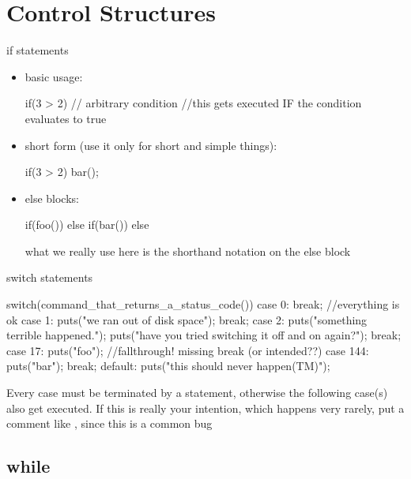 \documentclass[10pt,graphics,aspectratio=169,table]{beamer}
\begin{document}
\section{Control Structures}
\begin{frame}[fragile]{if statements}
    \begin{itemize}
    \item basic usage:
        \begin{codeblock} 
if(3 > 2){  // arbitrary condition
    //this gets executed IF the condition evaluates to true
}
        \end{codeblock}
    \item short form (use it only for short and simple things):
        \begin{codeblock} 
if(3 > 2) bar();
        \end{codeblock}

    \item else blocks:
        \begin{codeblock} 
if(foo()){ 
}
else if(bar()){ 
}
else{ 
}
        \end{codeblock}

        what we really use here is the shorthand notation on the else block

    \end{itemize}
\end{frame}

\begin{frame}[fragile]{switch statements}
    \begin{codeblock}
switch(command_that_returns_a_status_code()){
    case 0: break; //everything is ok
    case 1: puts("we ran out of disk space"); break;
    case 2: {
        puts("something terrible happened.");
        puts("have you tried switching it off and on again?");
    }break;
    case 17: puts("foo"); //fallthrough! missing break (or intended??)
    case 144: puts("bar"); break;
    default: puts("this should never happen(TM)");
}
    \end{codeblock}
    Every case must be terminated by a  statement, otherwise the 
    following case(s) also get executed. If this is really your intention,
    which happens very rarely, put a comment like , 
    since this is a common bug
\end{frame}

\subsection{while}
\end{document}

